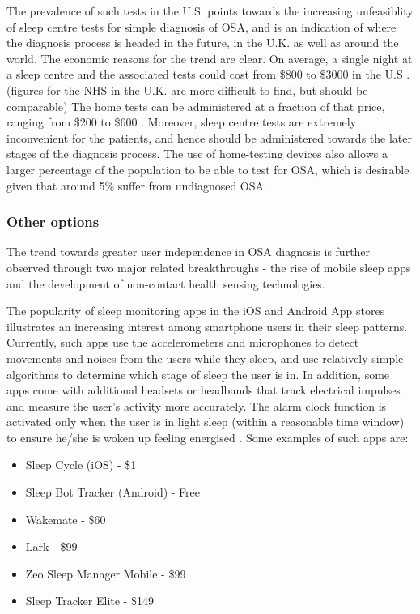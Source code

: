 The prevalence of such tests in the U.S. points towards the increasing
unfeasiblity of sleep centre tests for simple diagnosis of OSA, and
is an indication of where the diagnosis process is headed in the future,
in the U.K. as well as around the world. The economic reasons for
the trend are clear. On average, a single night at a sleep centre
and the associated tests could cost from \$800 to \$3000 in the U.S \cite{wsjhometest}.
(figures for the NHS in the U.K. are more difficult to find, but should
be comparable) The home tests can be administered at a fraction of
that price, ranging from \$200 to \$600 \cite{wsjhometest}. Moreover, sleep centre tests
are extremely inconvenient for the patients, and hence should be administered
towards the later stages of the diagnosis process. The use of home-testing
devices also allows a larger percentage of the population to be able
to test for OSA, which is desirable given that around 5\% suffer
from undiagnosed OSA \cite{nhsmain}.


\subsubsection{Other options}

The trend towards greater user independence in OSA diagnosis is further
observed through two major related breakthroughs - the rise of mobile
sleep apps and the development of non-contact health sensing technologies.

The popularity of sleep monitoring apps in the iOS and Android App
stores illustrates an increasing interest among smartphone users in
their sleep patterns. Currently, such apps use the accelerometers
and microphones to detect movements and noises from the users while they sleep, and use relatively simple algorithms to determine which stage of sleep the user is in. In addition, some apps come with additional headsets or headbands that track electrical impulses and measure the user's activity more accurately. The alarm clock function is activated only when the user is in light sleep (within a reasonable time window) to ensure he/she is woken up feeling energised \cite{currentapps}. Some examples of such apps are:

\begin{itemize}
\item Sleep Cycle (iOS) - \$1
\item Sleep Bot Tracker (Android) - Free
\item Wakemate - \$60
\item Lark - \$99
\item Zeo Sleep Manager Mobile - \$99
\item Sleep Tracker Elite - \$149 
\end{itemize}

